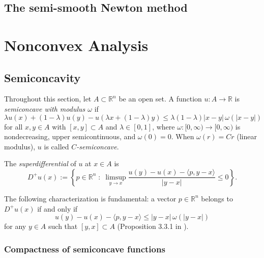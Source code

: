 \begin{theorem}
\end{theorem}


\section{The semi-smooth Newton method}



\chapter{Nonconvex Analysis}



\section{Semiconcavity}

Throughout this section, let $A \subset \mathbb{R}^n$ be an open set. A function $u : A \to \mathbb{R}$ is \emph{semiconcave with modulus $\omega$} if
\[
	\lambda u(x) + (1 - \lambda) u(y) - u(\lambda x + (1 - \lambda)y) \leqslant \lambda(1 - \lambda)|x - y|\,\omega(|x - y|)
\]
for all $x, y \in A$ with $[x,y] \subset A$ and $\lambda \in [0,1]$, where $\omega : [0, \infty) \to [0, \infty)$ is nondecreasing, upper semicontinuous, and $\omega(0) = 0$. When $\omega(r) = Cr$ (linear modulus), $u$ is called \emph{$C$-semiconcave}.

\begin{definition}
The \emph{superdifferential} of $u$ at $x \in A$ is
\[
	D^+ u(x) := \left\{ p \in \mathbb{R}^n \;:\; \limsup_{y \to x} \frac{u(y) - u(x) - \langle p, y - x \rangle}{|y - x|} \leqslant 0 \right\}.
\]
\end{definition}

The following characterization is fundamental: a vector $p \in \mathbb{R}^n$ belongs to $D^+ u(x)$ if and only if
\begin{equation}\label{eq:superdiff-prop331}
	u(y) - u(x) - \langle p, y - x \rangle \leqslant |y - x|\,\omega(|y - x|)
\end{equation}
for any $y \in A$ such that $[y, x] \subset A$ (Proposition 3.3.1 in \cite{cannarsa2004semiconcave}).

\subsection{Compactness of semiconcave functions}


